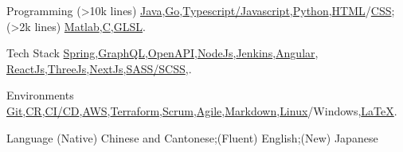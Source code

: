 
\begin{cvskills}
\cvskill
{Programming}
{(>10k lines) \href{https://www.java.com/en/}{Java},\href{https://go.dev/}{Go},\href{https://www.javascript.com/}{Typescript/Javascript},\href{https://www.python.org/}{Python},\href{https://developer.mozilla.org/en-US/docs/Glossary/HTML5}{HTML}/\href{https://developer.mozilla.org/en-US/docs/Web/CSS}{CSS};(>2k lines) \href{https://uk.mathworks.com/products/matlab.html}{Matlab},\href{https://en.wikipedia.org/wiki/C_(programming_language)}{C},\href{https://www.khronos.org/opengl/wiki/OpenGL_Shading_Language}{GLSL}.}

\cvskill
{Tech Stack}
{\href{https://spring.io/}{Spring},\href{https://graphql.org/}{GraphQL},\href{https://swagger.io/specification/}{OpenAPI},\href{https://nodejs.org/en/}{NodeJs},\href{https://www.jenkins.io/}{Jenkins},\href{https://angular.io/}{Angular}, \href{https://reactjs.org/}{ReactJs},\href{https://threejs.org/}{ThreeJs},\href{https://nextjs.org/}{NextJs},\href{https://sass-lang.com/}{SASS/SCSS},.}

\cvskill
{Environments}
{\href{https://git-scm.com/}{Git},\href{https://en.wikipedia.org/wiki/Code_review}{CR},\href{https://www.redhat.com/en/topics/devops/what-is-ci-cd}{CI/CD},\href{https://aws.amazon.com/}{AWS},\href{https://www.terraform.io/}{Terraform},\href{https://www.scrum.org/resources/what-is-scrum}{Scrum},\href{https://www.atlassian.com/agile}{Agile},\href{https://en.wikipedia.org/wiki/Markdown}{Markdown},\href{https://en.wikipedia.org/wiki/Unix}{Linux}/Windows,\href{https://www.latex-project.org/}{LaTeX}.}

\cvskill
{Language}
{(Native) Chinese and Cantonese;(Fluent) English;(New) Japanese}

\end{cvskills}